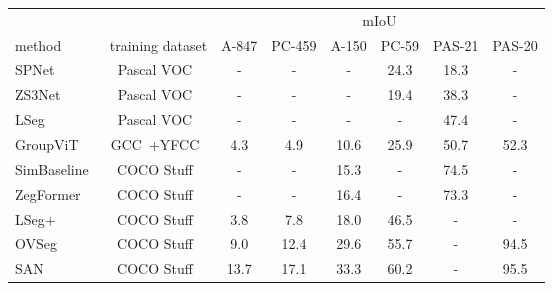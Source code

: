 \documentclass{article}
\newcommand{\modelname}{FC-CLIP\xspace}
\newcommand{\tablestyle}[2]{\setlength{\tabcolsep}{#1}\renewcommand{\arraystretch}{#2}\centering\footnotesize}
\begin{document}
\begin{table*}[!t]
\tablestyle{2pt}{1.02}
\caption{
    \label{tab:semantic}
    \textbf{Open-vocabulary semantic segmentation performance.}
    The proposed \modelname also demonstrates state-of-the-art performances on open-vocabulary semantic segmentation
}
\begin{tabular}{l|c|cccccc}
                                    &    & \multicolumn{6}{c}{mIoU}                                                                      \\
method                            & training dataset     & A-847         & PC-459        & A-150         & PC-59         & PAS-21  & PAS-20        \\
\shline
SPNet~\cite{xian2019semantic}         & Pascal VOC~\cite{everingham2010pascal}       & -             & -             & -             & 24.3          & 18.3       & -        \\
ZS3Net~\cite{bucher2019zero}     & Pascal VOC~\cite{everingham2010pascal}           & -             & -             & -             & 19.4          & 38.3       & -       \\
LSeg~\cite{li2022language}         & Pascal VOC~\cite{everingham2010pascal}          & -             & -             & -             & -             & 47.4      & -    \\
\hline
GroupViT~\cite{xu2022groupvit}     & GCC~\cite{sharma2018conceptual}+YFCC~\cite{thomee2016yfcc100m}     & 4.3           & 4.9           & 10.6          & 25.9          & 50.7        & 52.3     \\
\hline
SimBaseline~\cite{xu2021simple}    & COCO Stuff~\cite{caesar2018coco}              & -             & -             & 15.3          & -             & 74.5       & -     \\
ZegFormer~\cite{ding2022decoupling} & COCO Stuff~\cite{caesar2018coco}                & -             & -             & 16.4          & -             & 73.3    & -       \\
LSeg+~\cite{li2022language,ghiasi2022scaling}        & COCO Stuff~\cite{caesar2018coco}              & 3.8           & 7.8           & 18.0          & 46.5          & -         & -    \\
OVSeg~\cite{liang2022open}      & COCO Stuff~\cite{caesar2018coco}           & 9.0           & 12.4           & 29.6          & 55.7          & -         & 94.5      \\
SAN~\cite{xu2023side}      & COCO Stuff~\cite{caesar2018coco}           & 13.7           & 17.1           & 33.3          & 60.2          & -        & 95.5        \\

\end{tabular}
\end{table*}
\end{document}
